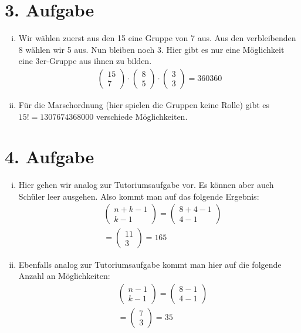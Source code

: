 \documentclass[10pt,a4paper,parskip=half]{scrartcl}
\begin{document}
\section*{3. Aufgabe}
\begin{enumerate}[(i)]
\item
	Wir wählen zuerst aus den 15 eine Gruppe von 7 aus. Aus den verbleibenden 8 wählen wir 5 aus. Nun bleiben noch 3. Hier gibt es nur eine Möglichkeit eine 3er-Gruppe aus ihnen zu bilden.
	\begin{align*}
	\begin{pmatrix}15\\7\end{pmatrix}\cdot\begin{pmatrix}8\\5\end{pmatrix}\cdot\begin{pmatrix}3\\3\end{pmatrix} = 360360
	\end{align*}
\item
	Für die Marschordnung (hier spielen die Gruppen keine Rolle) gibt es $15! = 1307674368000$ verschiede Möglichkeiten.
\end{enumerate}
\section*{4. Aufgabe}
\begin{enumerate}[(i)]
\item
	Hier gehen wir analog zur Tutoriumsaufgabe vor. Es können aber auch Schüler leer ausgehen. Also kommt man auf das folgende Ergebnis:
	\begin{align*}
	&\begin{pmatrix}n+k-1\\k-1\end{pmatrix}=\begin{pmatrix}8+4-1\\4-1\end{pmatrix}\\
	&= \begin{pmatrix}11\\3\end{pmatrix} = 165
	\end{align*}
\item
	Ebenfalls analog zur Tutoriumsaufgabe kommt man hier auf die folgende Anzahl an Möglichkeiten:
	\begin{align*}
	&\begin{pmatrix}n-1\\k-1\end{pmatrix}=\begin{pmatrix}8-1\\4-1\end{pmatrix}\\
	&= \begin{pmatrix}7\\3\end{pmatrix} = 35
	\end{align*}
\end{enumerate}
\end{document}
